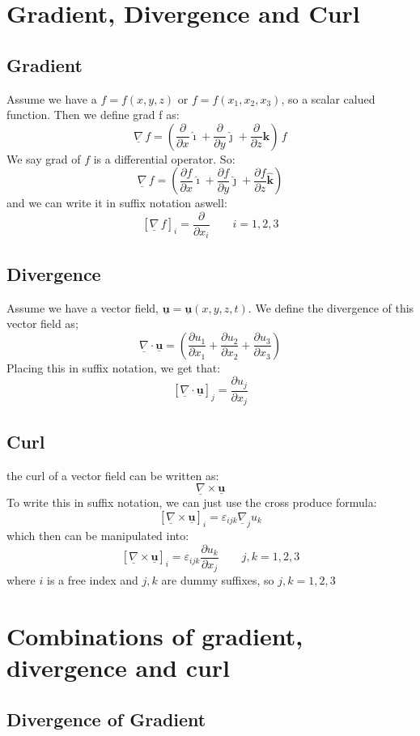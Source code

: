 \documentclass{article}
\renewcommand{\vec}[1]{\underline{\textbf{#1}}}
\newcommand{\veci}{\bm{\hat{\imath}}}
\newcommand{\vecj}{\bm{\hat{\jmath}}}
\newcommand{\veck}{\bm{\hat{k}}}
\newcommand{\e}{\varepsilon}
\newcommand{\nab}{\underline{\nabla}}
\newcommand{\grad}{{\nab}\, f}
\newcommand{\pd}[2]{\frac{\partial #1}{\partial #2}}
\renewcommand{\div}{\nab \cdot}
\newcommand{\curl}{\nab \times}
\begin{document}
\section{Gradient, Divergence and Curl}
\subsection{Gradient}

Assume we have a $f = f(x, y, z)$ or $f = f(x_1,x_2,x_3)$, so a scalar calued function. Then we define grad f as:
$$ \grad = \left(\pd{}{x}\veci + \pd{}{y}\vecj + \pd{}{z}\veck \right)\, f$$
We say grad of $f$ is a differential operator. So:
$$ \grad = \left(\pd{f}{x}\veci + \pd{f}{y}\vecj + \pd{f}{z}\veck \right) $$
and we can write it in suffix notation aswell:
$$ \left[ \grad \right]_i = \pd{}{x_i} \qquad i = 1, 2, 3$$

\subsection{Divergence}

Assume we have a vector field, $\vec{u} = \vec{u} (x, y, z, t)$. We define the divergence of this vector field as;
$$ \nab \cdot \vec{u} = \left(\pd{u_1}{x_1} + \pd{u_2}{x_2} + \pd{u_3}{x_3}\right)$$
Placing this in suffix notation, we get that:
$$ [\nab \cdot \vec{u}]_j = \pd{u_j}{x_j} $$

\subsection{Curl}

the curl of a vector field can be written as:
$$ \nab \times \vec{u} $$
To write this in suffix notation, we can just use the cross produce formula:
$$ [\nab \times \vec{u}]_i = \e_{ijk} \nab_j u_k $$
which then can be manipulated into:
$$ [\nab \times \vec{u}]_i = \e_{ijk} \pd{u_k}{x_j} \qquad j,k = 1, 2, 3 $$
where $i$ is a free index and $j, k$ are dummy suffixes, so $j, k = 1, 2, 3$

\section{Combinations of gradient, divergence and curl}%

\subsection{Divergence of Gradient}%
\end{document}

